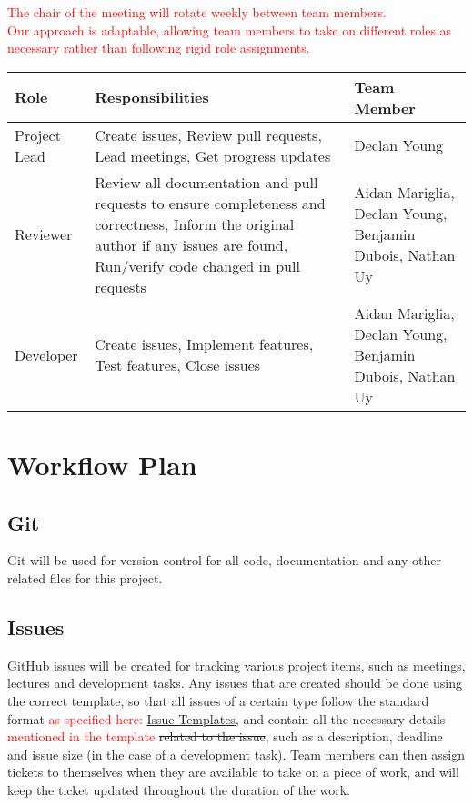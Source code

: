 \documentclass{article}
\begin{document}
\textcolor{red}{The chair of the meeting will rotate weekly between team members.} \\
\textcolor{red}{Our approach is adaptable, allowing team members to take on different roles as necessary rather than following rigid role assignments.}

\begin{table}[H]
\begin{tabular}{|p{3cm}|p{4cm}|p{3cm}|}
\hline
\textbf{Role} & \textbf{Responsibilities} & \textbf{Team Member} \\ \hline

Project Lead & Create issues, Review pull requests, Lead meetings, Get progress updates & Declan Young \\ \hline

Reviewer & Review all documentation and pull requests to ensure completeness and correctness, Inform the original author if any issues are found, Run/verify code changed in pull requests & Aidan Mariglia, Declan Young, Benjamin Dubois, Nathan Uy \\ \hline

Developer & Create issues, Implement features, Test features, Close issues & Aidan Mariglia, Declan Young, Benjamin Dubois, Nathan Uy \\ \hline
\end{tabular}
\end{table}

\section{Workflow Plan}

\subsection*{Git}
Git will be used for version control for all code, documentation and any other related files for this project.

\subsection*{Issues}
GitHub issues will be created for tracking various project items, such as meetings, lectures and development tasks. Any issues that are created should be done using the correct template, so that all issues of a certain type follow the standard format \textcolor{red}{as specified here: \href{https://github.com/AidanMariglia/SOCAlgoTestPlatform/tree/main/.github/ISSUE_TEMPLATE}{Issue Templates}}, and contain all the necessary details \textcolor{red}{mentioned in the template} \sout{related to the issue}, such as a description, deadline and issue size (in the case of a development task). Team members can then assign tickets to themselves when they are available to take on a piece of work, and will keep the ticket updated throughout the duration of the work.
\end{document}
